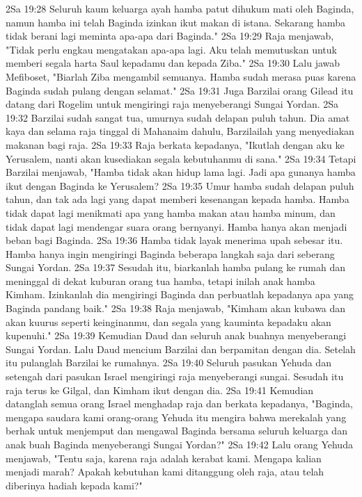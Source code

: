 2Sa 19:28  Seluruh kaum keluarga ayah hamba patut dihukum mati oleh Baginda, namun hamba ini telah Baginda izinkan ikut makan di istana. Sekarang hamba tidak berani lagi meminta apa-apa dari Baginda."
2Sa 19:29  Raja menjawab, "Tidak perlu engkau mengatakan apa-apa lagi. Aku telah memutuskan untuk memberi segala harta Saul kepadamu dan kepada Ziba."
2Sa 19:30  Lalu jawab Mefiboset, "Biarlah Ziba mengambil semuanya. Hamba sudah merasa puas karena Baginda sudah pulang dengan selamat."
2Sa 19:31  Juga Barzilai orang Gilead itu datang dari Rogelim untuk mengiringi raja menyeberangi Sungai Yordan.
2Sa 19:32  Barzilai sudah sangat tua, umurnya sudah delapan puluh tahun. Dia amat kaya dan selama raja tinggal di Mahanaim dahulu, Barzilailah yang menyediakan makanan bagi raja.
2Sa 19:33  Raja berkata kepadanya, "Ikutlah dengan aku ke Yerusalem, nanti akan kusediakan segala kebutuhanmu di sana."
2Sa 19:34  Tetapi Barzilai menjawab, "Hamba tidak akan hidup lama lagi. Jadi apa gunanya hamba ikut dengan Baginda ke Yerusalem?
2Sa 19:35  Umur hamba sudah delapan puluh tahun, dan tak ada lagi yang dapat memberi kesenangan kepada hamba. Hamba tidak dapat lagi menikmati apa yang hamba makan atau hamba minum, dan tidak dapat lagi mendengar suara orang bernyanyi. Hamba hanya akan menjadi beban bagi Baginda.
2Sa 19:36  Hamba tidak layak menerima upah sebesar itu. Hamba hanya ingin mengiringi Baginda beberapa langkah saja dari seberang Sungai Yordan.
2Sa 19:37  Sesudah itu, biarkanlah hamba pulang ke rumah dan meninggal di dekat kuburan orang tua hamba, tetapi inilah anak hamba Kimham. Izinkanlah dia mengiringi Baginda dan perbuatlah kepadanya apa yang Baginda pandang baik."
2Sa 19:38  Raja menjawab, "Kimham akan kubawa dan akan kuurus seperti keinginanmu, dan segala yang kauminta kepadaku akan kupenuhi."
2Sa 19:39  Kemudian Daud dan seluruh anak buahnya menyeberangi Sungai Yordan. Lalu Daud mencium Barzilai dan berpamitan dengan dia. Setelah itu pulanglah Barzilai ke rumahnya.
2Sa 19:40  Seluruh pasukan Yehuda dan setengah dari pasukan Israel mengiringi raja menyeberangi sungai. Sesudah itu raja terus ke Gilgal, dan Kimham ikut dengan dia.
2Sa 19:41  Kemudian datanglah semua orang Israel menghadap raja dan berkata kepadanya, "Baginda, mengapa saudara kami orang-orang Yehuda itu mengira bahwa merekalah yang berhak untuk menjemput dan mengawal Baginda bersama seluruh keluarga dan anak buah Baginda menyeberangi Sungai Yordan?"
2Sa 19:42  Lalu orang Yehuda menjawab, "Tentu saja, karena raja adalah kerabat kami. Mengapa kalian menjadi marah? Apakah kebutuhan kami ditanggung oleh raja, atau telah diberinya hadiah kepada kami?"
